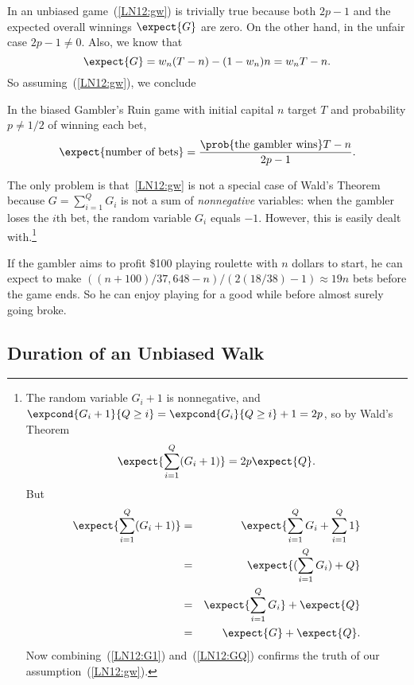In an unbiased game~(\ref{LN12:gw}) is trivially true because both $2p-1$ and
the expected overall winnings $\expect{G}$ are zero.
On the other hand, in the unfair case $2p-1 \neq 0$.  Also, we know that
\[
\expect{G} = w_n(T-n) - (1-w_n)n = w_nT-n.
\]
So assuming~(\ref{LN12:gw}), we conclude
\begin{theorem}\label{LN12:ExQthm}
In the biased Gambler's Ruin game with initial capital $n$ target
$T$ and probability $p \neq 1/2$ of winning each bet,
\begin{equation}\label{LN12:ExQ}
\expect{\text{number of bets}} =
\frac{\prob{\text{the gambler wins}}T-n}{2p-1}.
\end{equation}
\end{theorem}

The only problem is that~\eqref{LN12:gw} is not a special case of Wald's
Theorem because $G = \sum_{i=1}^Q G_i$ is not a sum of \emph{nonnegative}
variables: when the gambler loses the $i$th bet, the random variable $G_i$
equals $-1$.  However, this is easily dealt with.\footnote{The random variable
$G_i+1$ is nonnegative, and $\expcond{G_i+1}{Q \geq i} =
\expcond{G_i}{Q\geq i}+1 = 2p$, so by Wald's Theorem
\begin{equation}\label{LN12:G1}
\expect{\sum_{i=1}^Q (G_i+1)}  = 2p\expect{Q}.
\end{equation}
But
\begin{eqnarray}
\expect{\sum_{i=1}^Q (G_i+1)} & = & \expect{\sum_{i=1}^Q G_i + \sum_{i=1}^Q 1}\notag\\
   & = & \expect{(\sum_{i=1}^Q G_i) + Q}\notag\\
   & = & \expect{\sum_{i=1}^Q G_i} + \expect{Q}\notag\\
   & = & \expect{G} + \expect{Q}\label{LN12:GQ}.
\end{eqnarray}
Now combining~(\ref{LN12:G1}) and~(\ref{LN12:GQ}) confirms the truth of our
assumption~(\ref{LN12:gw}).}

\begin{example}
If the gambler aims to profit \$100 playing roulette with $n$ dollars to
start, he can expect to make $((n+100)/37,648 - n)/(2(18/38) - 1) \approx
19n$ bets before the game ends.  So he can enjoy playing for a good while
before almost surely going broke.
\end{example}

\subsection{Duration of an Unbiased Walk}

